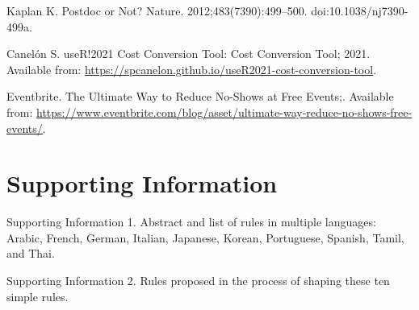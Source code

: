 \documentclass[10pt,letterpaper]{article}
\begin{document}
\begin{thebibliography}{10}
Kaplan K.
\newblock Postdoc or Not?
\newblock Nature. 2012;483(7390):499--500.
\newblock doi:{10.1038/nj7390-499a}.

Canelón S. useR!2021 Cost Conversion Tool: Cost Conversion Tool; 2021.
\newblock Available from:
  \url{https://spcanelon.github.io/useR2021-cost-conversion-tool}.

{Eventbrite}. The Ultimate Way to Reduce No-Shows at Free Events;.
\newblock Available from:
  \url{https://www.eventbrite.com/blog/asset/ultimate-way-reduce-no-shows-free-events/}.

\end{thebibliography}

\section*{Supporting Information}

Supporting Information 1. Abstract and list of rules in multiple languages: Arabic, French, German, Italian, Japanese, Korean, Portuguese, Spanish, Tamil, and Thai.

Supporting Information 2. Rules proposed in the process of shaping these ten simple rules. 
\end{document}
